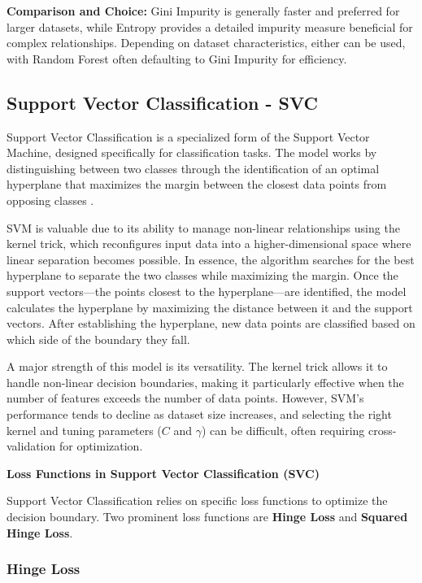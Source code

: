 \documentclass[titlepage]{article}
\begin{document}
\quad \textbf{Comparison and Choice:} Gini Impurity is generally faster and preferred for larger datasets, while Entropy provides a detailed impurity measure beneficial for complex relationships. Depending on dataset characteristics, either can be used, with Random Forest often defaulting to Gini Impurity for efficiency.


 \subsection{Support Vector Classification - SVC}

\quad Support Vector Classification is a specialized form of the Support Vector Machine, designed specifically for classification tasks. The model works by distinguishing between two classes through the identification of an optimal hyperplane that maximizes the margin between the closest data points from opposing classes \cite{SVM}.

SVM is valuable due to its ability to manage non-linear relationships using the kernel trick, which reconfigures input data into a higher-dimensional space where linear separation becomes possible. In essence, the algorithm searches for the best hyperplane to separate the two classes while maximizing the margin. Once the support vectors—the points closest to the hyperplane—are identified, the model calculates the hyperplane by maximizing the distance between it and the support vectors. After establishing the hyperplane, new data points are classified based on which side of the boundary they fall.

A major strength of this model is its versatility. The kernel trick allows it to handle non-linear decision boundaries, making it particularly effective when the number of features exceeds the number of data points. However, SVM's performance tends to decline as dataset size increases, and selecting the right kernel and tuning parameters (\( C \) and \( \gamma \)) can be difficult, often requiring cross-validation for optimization.

\quad \textbf{Loss Functions in Support Vector Classification (SVC)}

Support Vector Classification relies on specific loss functions to optimize the decision boundary. Two prominent loss functions are \textbf{Hinge Loss} and \textbf{Squared Hinge Loss}.

\subsubsection{Hinge Loss}
\end{document}
